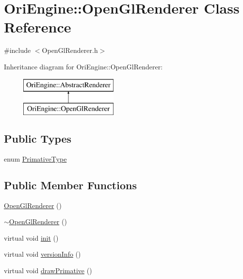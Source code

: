 \hypertarget{class_ori_engine_1_1_open_gl_renderer}{}\section{Ori\+Engine\+:\+:Open\+Gl\+Renderer Class Reference}
\label{class_ori_engine_1_1_open_gl_renderer}


{\ttfamily \#include $<$Open\+Gl\+Renderer.\+h$>$}

Inheritance diagram for Ori\+Engine\+:\+:Open\+Gl\+Renderer\+:\begin{figure}[H]
\begin{center}
\leavevmode
\includegraphics[height=2.000000cm]{class_ori_engine_1_1_open_gl_renderer}
\end{center}
\end{figure}
\subsection*{Public Types}
\begin{DoxyCompactItemize}
\item 
enum \hyperlink{class_ori_engine_1_1_open_gl_renderer_a2821e12392e46c549bd42b9951dbcb54}{Primative\+Type} 
\end{DoxyCompactItemize}
\subsection*{Public Member Functions}
\begin{DoxyCompactItemize}
\item 
\hyperlink{class_ori_engine_1_1_open_gl_renderer_aaa26a72feb4ccee93121b4e296184ef1}{Open\+Gl\+Renderer} ()
\item 
\hyperlink{class_ori_engine_1_1_open_gl_renderer_a184006c704765da13a684f88b355f693}{$\sim$\+Open\+Gl\+Renderer} ()
\item 
virtual void \hyperlink{class_ori_engine_1_1_open_gl_renderer_a702c4cfb099f77a04111740b9f3834e8}{init} ()
\item 
virtual void \hyperlink{class_ori_engine_1_1_open_gl_renderer_aaf6633305987ddf18d0a6e5e15e93352}{version\+Info} ()
\item 
virtual void \hyperlink{class_ori_engine_1_1_open_gl_renderer_ad75e25784e6aa3331f69b81b1b3774ff}{draw\+Primative} ()
\end{DoxyCompactItemize}


